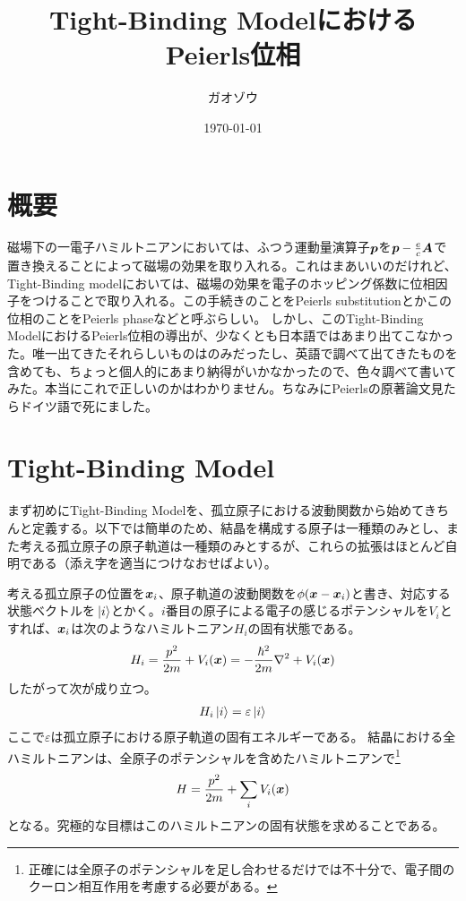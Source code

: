 \documentclass[uplatex,dvipdfmx, a4j]{jsarticle}
\title{Tight-Binding ModelにおけるPeierls位相}
\author{ガオゾウ}
\date{\today}
\begin{document}
\maketitle
\section{概要}
磁場下の一電子ハミルトニアンにおいては、ふつう運動量演算子$\vb*{p}$を$\vb*{p}-\frac{e}{c}\vb*{A}$で置き換えることによって磁場の効果を取り入れる。これはまあいいのだけれど、Tight-Binding modelにおいては、磁場の効果を電子のホッピング係数に位相因子をつけることで取り入れる。この手続きのことをPeierls substitutionとかこの位相のことをPeierls phaseなどと呼ぶらしい。
しかし、このTight-Binding ModelにおけるPeierls位相の導出が、少なくとも日本語ではあまり出てこなかった。唯一出てきたそれらしいものは\cite{NagaiNote}のみだったし、英語で調べて出てきたものを含めても、ちょっと個人的にあまり納得がいかなかったので、色々調べて書いてみた。本当にこれで正しいのかはわかりません。ちなみにPeierlsの原著論文見たらドイツ語で死にました。

\section{Tight-Binding Model}
まず初めにTight-Binding Modelを、孤立原子における波動関数から始めてきちんと定義する。以下では簡単のため、結晶を構成する原子は一種類のみとし、また考える孤立原子の原子軌道は一種類のみとするが、これらの拡張はほとんど自明である（添え字を適当につけなおせばよい）。

考える孤立原子の位置を$\vb*{x}_i$、原子軌道の波動関数を$\phi(\vb*{x}-\vb*{x}_i)$と書き、対応する状態ベクトルを$\ket*{i}$とかく。$i$番目の原子による電子の感じるポテンシャルを$V_i$とすれば、$\vb*{x}_i$は次のようなハミルトニアン$H_i$の固有状態である。
\begin{align}
	H_i = \frac{p^2}{2m} + V_i(\vb*{x}) = -\frac{\hbar^2}{2m}\nabla^2 + V_i(\vb*{x})
\end{align}
したがって次が成り立つ。
\begin{align}
	H_i\ket{i} = \varepsilon\ket{i}
\end{align}
ここで$\varepsilon$は孤立原子における原子軌道の固有エネルギーである。
結晶における全ハミルトニアンは、全原子のポテンシャルを含めたハミルトニアンで\footnote{正確には全原子のポテンシャルを足し合わせるだけでは不十分で、電子間のクーロン相互作用を考慮する必要がある。}
\begin{align}
	H = \frac{p^2}{2m} + \sum_i V_i(\vb*{x}) \label{eq:Hamiltonian}
\end{align}
となる。究極的な目標はこのハミルトニアンの固有状態を求めることである。
\end{document}
